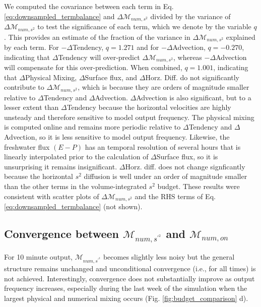 We computed the covariance between each term in Eq. \ref{eq:downsampled_termbalance} and $\Delta \mathcal{M}_{num, s^2}$ divided by the variance of $\Delta \mathcal{M}_{num, s^2}$ to test the significance of each term, which we denote by the variable $q$. This provides an estimate of the fraction of the variance in $\Delta \mathcal{M}_{num, s^2}$ explained by each term. For $-\Delta$Tendency, $q = 1.271$ and for $-\Delta$Advection, $q = -0.270$, indicating that $\Delta$Tendency will over-predict $\Delta \mathcal{M}_{num, s^2}$, whereas $-\Delta$Advection will compensate for this over-prediction. When combined, $q = 1.001$, indicating that $\Delta$Physical Mixing, $\Delta$Surface flux, and $\Delta$Horz. Diff. do not significantly contribute to $\Delta \mathcal{M}_{num, s^2}$, which is because they are orders of magnitude smaller relative to $\Delta$Tendency and $\Delta$Advection. $\Delta$Advection is also significant, but to a lesser extent than $\Delta$Tendency because the horizontal velocities are highly unsteady and therefore sensitive to model output frequency. The physical mixing is computed online and remains more periodic relative to $\Delta$Tendency and $\Delta$Advection, so it is less sensitive to model output frequency. Likewise, the freshwater flux $(E-P)$ has an temporal resolution of several hours that is linearly interpolated prior to the calculation of $\Delta$Surface flux, so it is unsurprising it remains insignificant. $\Delta$Horz. diff. does not change signficantly because the horizontal $s^2$ diffusion is well under an order of magnitude smaller than the other terms in the volume-integrated $s^2$ budget. These results were consistent with scatter plots of $\Delta \mathcal{M}_{num, s^2}$ and the RHS terms of Eq. \ref{eq:downsampled_termbalance} (not shown). 

\subsection{Convergence between $\mathcal{M}_{num,s^{\prime^2}}$ and $\mathcal{M}_{num,on}$}
\label{sec:sprime2_online_conv}

For 10 minute output, $\mathcal{M}_{num,s^{\prime^2}}$ becomes slightly less noisy but the general structure remains unchanged and unconditional convergence (i.e., for all times) is not achieved. Interestingly, convergence does not substantially improve as output frequency increases, especially during the last week of the simulation when the largest physical and numerical mixing occurs (Fig. \ref{fig:budget_comparison} d). 


